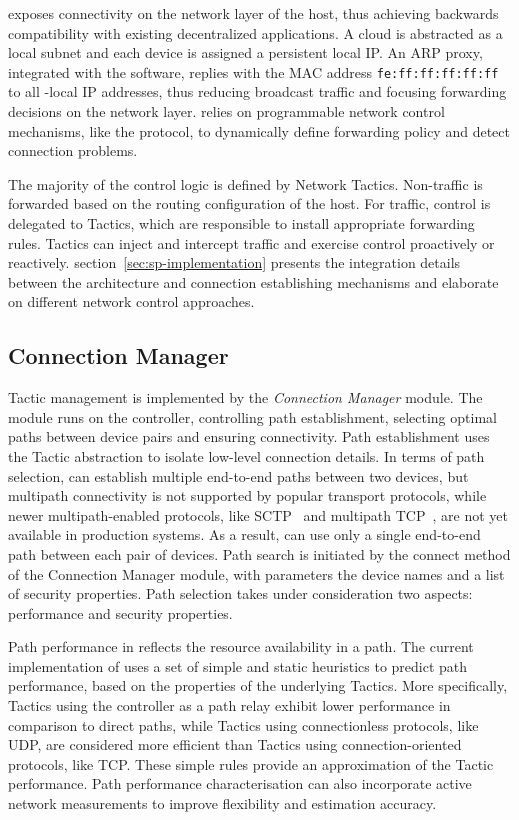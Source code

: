 \signpost exposes connectivity on the network layer of the host, thus achieving
backwards compatibility with existing decentralized applications. A \signpost
cloud is abstracted as a local subnet and each device is assigned a persistent
local IP\@. An ARP proxy, integrated with the \signpost software, 
replies with the MAC address \texttt{fe:ff:ff:ff:ff:ff}\/ to all \signpost-local
IP addresses, thus reducing broadcast traffic and focusing forwarding decisions
on the network layer.  \signpost relies on programmable network control
mechanisms, like the \of protocol, to dynamically define forwarding policy and
detect connection problems.

The majority of the \signpost control logic is defined by Network Tactics.
Non-\signpost traffic is forwarded based on the routing configuration of the
host.  For \signpost traffic, control is delegated to Tactics, which are
responsible to install appropriate forwarding rules.  Tactics can inject and
intercept traffic and exercise control proactively or reactively.
section~\ref{sec:sp-implementation} presents the  integration details between
the \signpost architecture and connection establishing mechanisms and elaborate
on different network control approaches.  

\subsection{Connection Manager} \label{sec:sp-engine}

\signpost Tactic management is implemented by the \textit{Connection Manager}
module.  The module runs on the \signpost controller, controlling path
establishment, selecting optimal paths between device pairs and ensuring
connectivity.  Path establishment uses the Tactic abstraction to isolate
low-level connection details.  In terms of path selection, \signpost can
establish multiple end-to-end paths between two devices, but multipath
connectivity is not supported by popular transport protocols, while newer
multipath-enabled protocols, like SCTP~ and multipath
TCP~, are not yet available in production systems.  As a result,
\signpost can use only a single end-to-end path between each pair of devices.
Path search is initiated by the connect method of the Connection Manager module,
with parameters the device names and a list of security properties. Path
selection takes under consideration two aspects: performance and security
properties.  

Path performance in \signpost reflects the resource availability in a path. The
current implementation of \signpost uses a set of simple and static heuristics
to predict path performance, based on the properties of the underlying Tactics.
More specifically, Tactics using the \signpost controller as a path relay exhibit
lower performance in comparison to direct paths, while Tactics using
connectionless protocols, like UDP, are considered more efficient than Tactics
using connection-oriented protocols, like TCP\@.  These simple rules provide an
approximation of the Tactic performance.  Path performance characterisation can
also incorporate active network measurements to improve flexibility and
estimation accuracy. 


